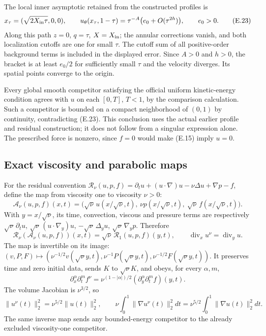 \documentclass[10pt,a4paper]{article}
\begin{document}
The local inner asymptotic retained from the constructed profiles is
\[
 x_\tau=(\sqrt{2X_{\rm in}\tau},0,0),\qquad
 u_\theta(x_\tau,1-\tau)=
       \tau^{-A}\big(e_0+O(\tau^{2h})\big),\qquad e_0>0.
 \tag{E.23}
\]
Along this path $z=0$, $q=\tau$, $X=X_{\rm in}$; the annular
corrections vanish, and both localization cutoffs are one for small
$\tau$. The cutoff sum of all positive-order background terms is
included in the displayed error. Since $A>0$ and $h>0$, the bracket
is at least $e_0/2$ for sufficiently small $\tau$ and the velocity
diverges. Its spatial points converge to the origin.

Every global smooth competitor satisfying the official uniform
kinetic-energy condition agrees with $u$ on each $[0,T]$, $T<1$,
by the comparison calculation. Such a competitor is bounded on a
compact neighborhood of $(0,1)$ by continuity, contradicting
(E.23). This conclusion uses the actual earlier profile and residual
construction; it does not follow from a singular expression alone.
The prescribed force is nonzero, since $f=0$ would make (E.15) imply
$u=0$.

\subsection{Exact viscosity and parabolic maps}

For the residual convention
$\mathcal R_\nu(u,p,f)=\partial_tu+(u\cdot\nabla)u-\nu\Delta u
 +\nabla p-f$, define the map from viscosity one to viscosity $\nu>0$:
\[
 \mathscr A_\nu(u,p,f)(x,t)=
 \big(\sqrt\nu\,u(x/\sqrt\nu,t),\
       \nu p(x/\sqrt\nu,t),\
       \sqrt\nu\,f(x/\sqrt\nu,t)\big).
 \tag{E.24}
\]
With $y=x/\sqrt\nu$, its time, convection, viscous and pressure
terms are respectively
$\sqrt\nu\,\partial_tu$, $\sqrt\nu\,(u\cdot\nabla_y)u$,
$-\sqrt\nu\,\Delta_yu$, $\sqrt\nu\,\nabla_yp$. Therefore
\[
 \mathcal R_\nu(\mathscr A_\nu(u,p,f))(x,t)
       =\sqrt\nu\,\mathcal R_1(u,p,f)(y,t),\qquad
 \operatorname{div}_x u^\nu=\operatorname{div}_yu.
\]
The map is invertible on its image:
$(v,P,F)\mapsto(\nu^{-1/2}v(\sqrt\nu y,t),
\nu^{-1}P(\sqrt\nu y,t),\nu^{-1/2}F(\sqrt\nu y,t))$.
It preserves time and zero initial data, sends $K$ to $\sqrt\nu K$,
and obeys, for every $\alpha,m$,
\[
 \partial_x^\alpha\partial_t^mf^\nu
       =\nu^{(1-|\alpha|)/2}
          (\partial_y^\alpha\partial_t^mf)(y,t).
\]
The volume Jacobian is $\nu^{3/2}$, so
\[
 \|u^\nu(t)\|_2^2=\nu^{5/2}\|u(t)\|_2^2,\qquad
 \nu\int_0^1\|\nabla u^\nu(t)\|_2^2dt
       =\nu^{5/2}\int_0^1\|\nabla u(t)\|_2^2dt.
 \tag{E.25}
\]
The same inverse map sends any bounded-energy competitor to the
already excluded viscosity-one competitor.
\end{document}
